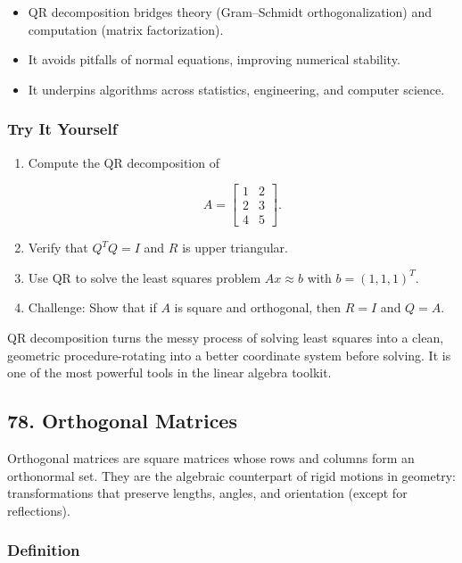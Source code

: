 \documentclass[
  letterpaper,
  DIV=11,
  numbers=noendperiod]{scrreprt}
\providecommand{\tightlist}{%
  \setlength{\itemsep}{0pt}\setlength{\parskip}{0pt}}
\begin{document}
\begin{itemize}
\tightlist
\item
  QR decomposition bridges theory (Gram--Schmidt orthogonalization) and
  computation (matrix factorization).
\item
  It avoids pitfalls of normal equations, improving numerical stability.
\item
  It underpins algorithms across statistics, engineering, and computer
  science.
\end{itemize}

\subsubsection{Try It Yourself}\label{try-it-yourself-76}

\begin{enumerate}
\def\labelenumi{\arabic{enumi}.}
\item
  Compute the QR decomposition of

  \[
  A = \begin{bmatrix}1 & 2 \\ 2 & 3 \\ 4 & 5\end{bmatrix}.
  \]
\item
  Verify that \(Q^T Q = I\) and \(R\) is upper triangular.
\item
  Use QR to solve the least squares problem \(Ax \approx b\) with
  \(b=(1,1,1)^T\).
\item
  Challenge: Show that if \(A\) is square and orthogonal, then \(R=I\)
  and \(Q=A\).
\end{enumerate}

QR decomposition turns the messy process of solving least squares into a
clean, geometric procedure-rotating into a better coordinate system
before solving. It is one of the most powerful tools in the linear
algebra toolkit.

\subsection{78. Orthogonal Matrices}\label{orthogonal-matrices}

Orthogonal matrices are square matrices whose rows and columns form an
orthonormal set. They are the algebraic counterpart of rigid motions in
geometry: transformations that preserve lengths, angles, and orientation
(except for reflections).

\subsubsection{Definition}\label{definition-5}
\end{document}
